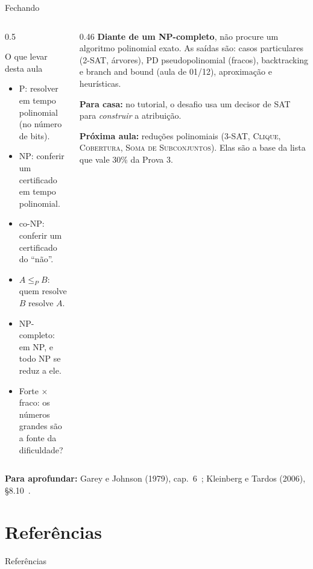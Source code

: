 \documentclass[aspectratio=169,xcolor=table]{beamer}
\newcommand{\fonte}[1]{%
  \vfill
  {\tiny\color{gray!55!black}\textbf{Para aprofundar:} #1\par}%
}
\newcommand{\prob}[1]{\textsc{#1}}
\begin{document}
\begin{frame}{Fechando}
  \begin{columns}[T]
    \begin{column}{0.5\textwidth}
      \begin{block}{O que levar desta aula}
        \scriptsize
        \begin{itemize}
          \item P: resolver em tempo polinomial (no número de bits).
          \item NP: conferir um certificado em tempo polinomial.
          \item co-NP: conferir um certificado do ``não''.
          \item $A \le_P B$: quem resolve $B$ resolve $A$.
          \item NP-completo: em NP, e todo NP se reduz a ele.
          \item Forte $\times$ fraco: os números grandes são a fonte da dificuldade?
        \end{itemize}
      \end{block}
    \end{column}
    \begin{column}{0.46\textwidth}
      \scriptsize
      \textbf{Diante de um NP-completo}, não procure um algoritmo polinomial exato. As
      saídas são: casos particulares (2-SAT, árvores), PD pseudopolinomial (fracos),
      backtracking e branch and bound (aula de 01/12), aproximação e heurísticas.
      \medskip

      \textbf{Para casa:} no tutorial, o desafio usa um decisor de \prob{SAT} para
      \emph{construir} a atribuição.
      \medskip

      \textbf{Próxima aula:} reduções polinomiais (\prob{3-SAT}, \prob{Clique},
      \prob{Cobertura}, \prob{Soma de Subconjuntos}). Elas são a base da lista que vale
      30\% da Prova 3.
    \end{column}
  \end{columns}
  \fonte{Garey e Johnson (1979), cap.~6~\cite{garey1979computers};
    Kleinberg e Tardos (2006), \S 8.10~\cite{kleinberg2006algorithm}.}
\end{frame}

\section*{Referências}
\begin{frame}[allowframebreaks]{Referências}
  \tiny
  \nocite{*}
  
  
\end{frame}
\end{document}
